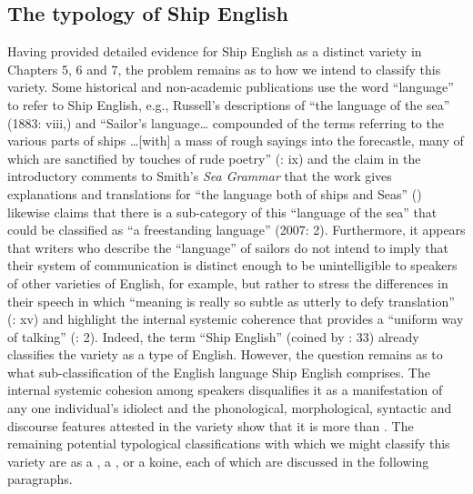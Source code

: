 \subsection{{The typology of Ship English} }%

Having provided detailed evidence for Ship English as a distinct variety in Chapters 5, 6 and 7, the problem remains as to how we intend to classify this variety. Some historical and non-academic publications use the word “language” to refer to Ship English, e.g., Russell’s descriptions of “the language of the sea” (1883: viii,) and “Sailor’s language… compounded of the terms referring to the various parts of ships …[with] a mass of rough sayings into the forecastle, many of which are sanctified by touches of rude poetry” (\citealt{Russell1883}: ix) and the claim in the introductory comments to Smith’s \textit{Sea Grammar} that the work gives explanations and translations for “the language both of ships and Seas” (\citealt{Smith1627}) \citeauthor{Choundas2007} likewise claims that there is a sub-category of this “language of the sea” that could be classified as “a freestanding  language” (2007: 2). Furthermore, it appears that writers who describe the “language” of sailors do not intend to imply that their system of communication is distinct enough to be unintelligible to speakers of other varieties of English, for example, but rather to stress the differences in their speech in which “meaning is really so subtle as utterly to defy translation” (\citealt{Russell1883}: xv) and highlight the internal systemic coherence that provides a “uniform way of talking” (\citealt{Choundas2007}: 2). Indeed, the term “Ship English” (coined by \citealt{Hancock1976}: 33) already classifies the variety as a type of English. However, the question remains as to what sub-classification of the English language Ship English comprises. The internal systemic cohesion among speakers disqualifies it as a manifestation of any one individual’s idiolect and the phonological, morphological, syntactic and discourse features attested in the variety show that it is more than . The remaining potential typological classifications with which we might classify this variety are as a , a , or a koine, each of which are discussed in the following paragraphs. 

